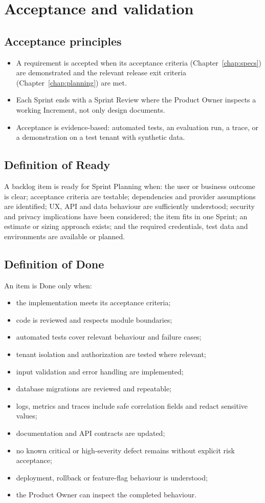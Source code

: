 \chapter{Acceptance and validation}\label{chap:acceptance}

\section{Acceptance principles}
\begin{itemize}
  \item A requirement is accepted when its acceptance criteria (Chapter~\ref{chap:specs}) are demonstrated and the relevant release exit criteria (Chapter~\ref{chap:planning}) are met.
  \item Each Sprint ends with a Sprint Review where the Product Owner inspects a working Increment, not only design documents.
  \item Acceptance is evidence-based: automated tests, an evaluation run, a trace, or a demonstration on a test tenant with synthetic data.
\end{itemize}

\section{Definition of Ready}
A backlog item is ready for Sprint Planning when: the user or business outcome is clear; acceptance criteria are testable; dependencies and provider assumptions are identified; UX, API and data behaviour are sufficiently understood; security and privacy implications have been considered; the item fits in one Sprint; an estimate or sizing approach exists; and the required credentials, test data and environments are available or planned.

\section{Definition of Done}
An item is Done only when:
\begin{itemize}
  \item the implementation meets its acceptance criteria;
  \item code is reviewed and respects module boundaries;
  \item automated tests cover relevant behaviour and failure cases;
  \item tenant isolation and authorization are tested where relevant;
  \item input validation and error handling are implemented;
  \item database migrations are reviewed and repeatable;
  \item logs, metrics and traces include safe correlation fields and redact sensitive values;
  \item documentation and API contracts are updated;
  \item no known critical or high-severity defect remains without explicit risk acceptance;
  \item deployment, rollback or feature-flag behaviour is understood;
  \item the Product Owner can inspect the completed behaviour.
\end{itemize}

